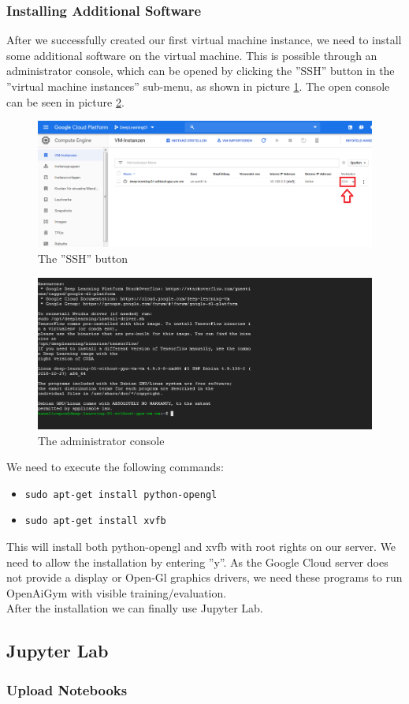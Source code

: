 \documentclass[a4paper]{article}
\begin{document}
\subsubsection{Installing Additional Software}
After we successfully created our first virtual machine instance, we need to install some additional software on the virtual machine. This is possible through an administrator console, which can be opened by clicking the ''SSH'' button in the ''virtual machine instances'' sub-menu, as shown in picture \ref{fig_adminConsole}. The open console can be seen in picture \ref{fig_adminConsole2}.\\
\begin{figure}[H]
	\centerline{\includegraphics[width=\textwidth]{img/adminConsole}}
	\caption{The ''SSH'' button}
	\label{fig_adminConsole}
\end{figure}
\begin{figure}[H]
	\centerline{\includegraphics[width=\textwidth]{img/adminConsole2}}
	\caption{The administrator console}
	\label{fig_adminConsole2}
\end{figure}
We need to execute the following commands:
\begin{itemize}
	\item \lstinline|sudo apt-get install python-opengl|
	\item \lstinline|sudo apt-get install xvfb|
\end{itemize}
This will install both python-opengl and xvfb with root rights on our server. We need to allow the installation by entering ''y''.  As the Google Cloud server does not provide a display or Open-Gl graphics drivers, we need these programs to run OpenAiGym with visible training/evaluation.\\
After the installation we can finally use Jupyter Lab.
\subsection{Jupyter Lab}
\subsubsection{Upload Notebooks}
\end{document}
